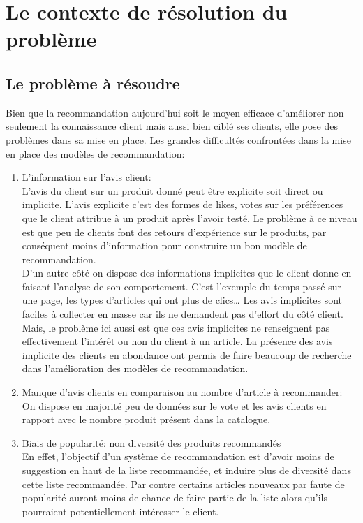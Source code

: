\chapter{Le contexte de résolution du problème}
\minitoc
\newpage
 
\section{Le problème à résoudre} 
Bien que la recommandation aujourd'hui soit le moyen efficace d'améliorer non seulement la connaissance client mais aussi bien ciblé ses clients, elle pose des problèmes dans sa mise en place. 
Les grandes difficultés confrontées dans la mise en place des modèles de recommandation:
\begin{enumerate}
\item L’information sur l’avis client:\\
L’avis du client sur un produit donné peut être explicite soit direct ou implicite. L’avis explicite c’est des formes de likes, votes sur les préférences que le client attribue à un produit après l’avoir testé. Le problème à ce niveau est que peu de clients font des retours d’expérience sur le produits, par conséquent moins d’information pour construire un bon modèle de recommandation.\\
D’un autre côté on dispose des informations implicites que le client donne en faisant l’analyse de son comportement. C’est l’exemple du temps passé sur une page, les types d’articles qui ont plus de clics… Les avis implicites sont faciles à collecter en masse car ils ne demandent pas d’effort du côté client. Mais, le problème ici aussi est que ces avis implicites ne renseignent pas effectivement l'intérêt ou non du client à un article. La présence des avis implicite des clients en abondance ont permis de faire beaucoup de recherche dans l’amélioration des modèles de recommandation.  

\item Manque d’avis clients en comparaison au nombre d’article à recommander:\\
On dispose en majorité peu de données sur le vote et les avis clients en rapport avec le nombre produit présent dans la catalogue. 

\item Biais de popularité: non diversité des produits recommandés\\
En effet, l'objectif d'un système de recommandation est d'avoir moins de suggestion en haut de la liste recommandée, et induire plus de diversité dans cette liste recommandée. Par contre certains articles nouveaux par faute de popularité auront moins de chance de faire partie de la liste alors qu’ils pourraient potentiellement intéresser le client.
\end{enumerate}

